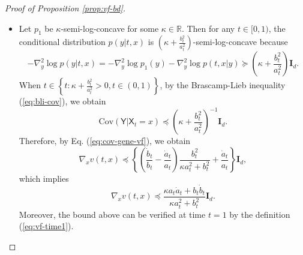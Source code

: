 \documentclass[twoside,11pt]{article}
\def\rmI{{\mathbf{I}}}
\def\sR{{\mathbb{R}}}
\newcommand{\Cov}{\mathrm{Cov}}
\def\paref#1{(\ref{#1})}
\numberwithin{equation}{section}
\begin{document}
\begin{proof} [Proof of Proposition \ref{prop:vf-bd}]
\begin{itemize}
\item[(c)] Let $p_1$ be $\kappa$-semi-log-concave for some $\kappa \in \sR$. Then for any $t\in [0,1)$, the conditional distribution $p(y | t, x)$ is $\left(\kappa + \frac{b_t^2}{a_t^2} \right)$-semi-log-concave because
\begin{equation*}
    -\nabla^2_y \log p(y | t, x)
    = -\nabla^2_y \log p_1(y) - \nabla^2_y \log p(t, x | y)
    \succeq \left( \kappa + \frac{b_t^2}{a_t^2} \right) \rmI_d.
\end{equation*}
When $t \in \left\{ t : \kappa + \frac{b_t^2}{a_t^2} > 0, t \in (0, 1) \right\}$, by the Brascamp-Lieb inequality \paref{eq:bli-cov}, we obtain
\begin{equation*}
    \Cov (\mathsf{Y} | \mathsf{X}_t = x) \preceq \left(\kappa + \frac{b_t^2}{a_t^2} \right)^{-1} \rmI_d.
\end{equation*}
Therefore, by Eq. \paref{eq:cov-gene-vf}, we obtain
\begin{equation*}
    \nabla_x v(t, x) \preceq
    \left\{ \left( \frac{\dot{b}_t}{b_t} - \frac{\dot{a}_t}{a_t} \right) \frac{b_t^2}{\kappa a_t^2 + b_t^2} + \frac{\dot{a}_t} {a_t} \right\} \rmI_d,
\end{equation*}
which implies
\begin{equation*}
    \nabla_x v(t, x) \preceq \frac{\kappa a_t \dot{a}_t + b_t \dot{b}_t} {\kappa a_t^2 + b_t^2} \rmI_d.
\end{equation*}
Moreover, the bound above can be verified at time $t = 1$ by the definition \paref{eq:vf-time1}.


\end{itemize}
\end{proof}
\end{document}

